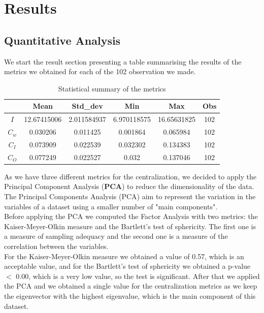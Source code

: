 \documentclass[12pt, a4paper]{article}
\begin{document}
\section{Results}
\subsection{Quantitative Analysis}
\label{quantitative-analysis}
We start the result section presenting a table summarising the results of the metrics we obtained for each of the 102 observation we made. \\
\begin{table}[H]
        \centering
        \begin{tabular}{|c|c|c|c|c|c|}
                \hline
                & \textbf{Mean} & \textbf{Std\_dev} & \textbf{Min} & \textbf{Max} &   \textbf{Obs} \\
                \hline
                \textbf{$I$}  &  12.67415006 & 2.011584937 & 6.970118575 &16.65631825 &  102 \\
                \hline
                \textbf{$C_w$}  &  0.030206  &  0.011425 & 0.001864 & 0.065984 & 102 \\
                \hline
                \textbf{$C_I$} & 0.073909 & 0.022539 & 0.032302 & 0.134383 & 102 \\
                \hline
                \textbf{$C_O$} & 0.077249 & 0.022527 & 0.032 & 0.137046 & 102 \\
                \hline
        \end{tabular}
        \caption{Statistical summary of the metrics}
\end{table}
As we have three different metrics for the centralization, we decided to apply the Principal Component Analysis (\textbf{PCA}) to reduce the dimensionality of the data. The Principal Components Analysis (PCA) aim to represent the variation in the variables of a dataset using a smaller number of "main components".\\
Before applying the PCA we computed the Factor Analysis with two metrics: the Kaiser-Meyer-Olkin measure and the Bartlett's test of sphericity. The first one is a measure of sampling adequacy and the second one is a measure of the correlation between the variables. \\
For the Kaiser-Meyer-Olkin measure we obtained a value of 0.57, which is an acceptable value, and for the Bartlett's test of sphericity we obtained a p-value $<$ 0.00, which is a very low value, so the test is significant.
After that we applied the PCA and we obtained a single value for the centralization metrics as we keep the eigenvector with the highest eigenvalue, which is the main component of this dataset. \\
\end{document}
